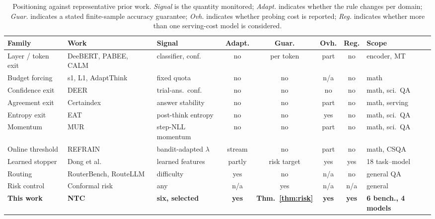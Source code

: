 \documentclass[acmsmall]{acmart}
\theoremstyle{acmdefinition}%
\theoremstyle{acmplain}}{}%
\begin{document}
\begin{table}[t]
\caption{Positioning against representative prior work. \emph{Signal} is the quantity monitored; \emph{Adapt.} indicates whether the rule changes per domain; \emph{Guar.} indicates a stated finite-sample accuracy guarantee; \emph{Ovh.} indicates whether probing cost is reported; \emph{Reg.} indicates whether more than one serving-cost model is considered.}
\label{tab:related}
\footnotesize
\setlength{\tabcolsep}{3.2pt}
\begin{tabular}{@{}L{1.32cm}L{2.28cm}L{1.72cm}ccccL{1.62cm}@{}}
\toprule
\textbf{Family} & \textbf{Work} & \textbf{Signal} & \textbf{Adapt.} & \textbf{Guar.} & \textbf{Ovh.} & \textbf{Reg.} & \textbf{Scope} \\
\midrule
Layer / token exit & DeeBERT, PABEE, CALM~\cite{xin2020deebert,liu2020fastbert,zhou2020bert,schuster2022confident} & classifier, conf. & no & per token & part & no & encoder, MT \\[2pt]
Budget forcing & s1, L1, AdaptThink~\cite{muennighoff2025s1,aggarwal2025l1,zhang2025adaptthink} & fixed quota & no & no & n/a & no & math \\[2pt]
Confidence exit & DEER~\cite{yang2025deer} & trial-ans.\ conf. & no & no & no & no & math, sci.\ QA \\[2pt]
Agreement exit & Certaindex~\cite{fu2024certaindex} & answer stability & no & no & part & no & math, serving \\[2pt]
Entropy exit & EAT~\cite{wang2025eat} & post-think entropy & no & no & yes & no & math, sci.\ QA \\[2pt]
Momentum & MUR~\cite{yan2025mur} & step-NLL momentum & no & no & part & no & math, sci.\ QA \\[2pt]
Online threshold & REFRAIN~\cite{sun2025refrain} & bandit-adapted $\lambda$ & stream & no & part & no & math, CSQA \\[2pt]
Learned stopper & Dong et al.~\cite{dong2026learning} & learned features & partly & risk target & yes & yes & 18 task--model \\[2pt]
Routing & RouterBench, RouteLLM~\cite{hu2024routerbench,ong2024routellm,ding2024hybrid} & difficulty & yes & no & n/a & no & general QA \\[2pt]
Risk control & Conformal risk~\cite{angelopoulos2024conformal} & any & n/a & yes & n/a & n/a & general \\
\midrule
\textbf{This work} & \textbf{NTC} & \textbf{six, selected} & \textbf{yes} & \textbf{Thm.~\ref{thm:risk}} & \textbf{yes} & \textbf{yes} & \textbf{6 bench., 4 models} \\
\bottomrule
\end{tabular}
\end{table}
\end{document}
